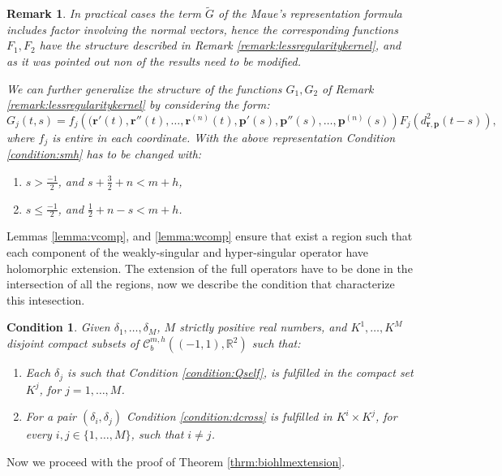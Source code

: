 \documentclass{article}
\newtheorem{remark}[theorem]{Remark}
\newtheorem{condition}[theorem]{Condition}
\newcommand{\IR}{{\mathbb R}}
\newcommand{\bp}{{\bm p}}
\newcommand{\rgeoh}[2]{\mathcal{C}_b^{#1,#2}\left( (-1,1), \IR^2 \right)}
\newcommand{\br}{\bm{r}}
\begin{document}
\begin{remark}
\label{remark:evenlessreg}
In practical cases the term $\widetilde{G}$ of the Maue's representation formula includes factor involving the normal vectors, hence the corresponding functions $F_1,F_2$ have the structure described in Remark \ref{remark:lessregularitykernel}, and as it was pointed out non of the results need to be modified.

We can further generalize the structure of the functions $G_1,G_2$ of Remark \ref{remark:lessregularitykernel} by considering the form:
$$
G_j(t,s) = f_j\left((\br'(t),\br''(t),\hdots,\br^{(n)}(t),\bp'(s),\bp''(s),\hdots,\bp^{(n)}(s)\right)F_j(d_{\br,\bp}^2(t-s)),
$$
where $f_j$ is entire in each coordinate. With the above representation Condition \ref{condition:smh} has to be changed with:
\begin{enumerate}
\item[i] 
$s > \frac{-1}{2}$, and $s+
\frac{3}{2}+n<m+h$,
\item[ii] 
$ s \leq \frac{-1}{2}$, and $\frac{1}{2}+n -s < m+h$.
\end{enumerate}  
\end{remark}
Lemmas \ref{lemma:vcomp}, and \ref{lemma:wcomp} ensure that exist a region such that each component of the weakly-singular and hyper-singular operator have holomorphic extension. The extension of the full operators have to be done in the intersection of all the regions, now we describe the condition that characterize this intesection. 

\begin{condition}
\label{condition:deltaOps}
Given $\delta_1,\hdots,\delta_M$, $M$ strictly positive real numbers, and $K^1,\hdots,K^M$ disjoint compact subsets of $\rgeoh{m}{h}$ such that: 
\begin{enumerate}
\item[i] Each $\delta_j$ is such that Condition \ref{condition:Qself}, is fulfilled in the compact set $K^j$, for $j=1,\hdots,M$.
\item[ii]
For a pair $(\delta_i, \delta_j)$ Condition \ref{condition:dcross} is fulfilled in $K^i\times K^j$, for every $i,j \in \{1,\hdots,M\}$, such that $i \neq j$.
\end{enumerate} 
\end{condition}

Now we proceed with the proof of Theorem \ref{thrm:biohlmextension}.
\end{document}
